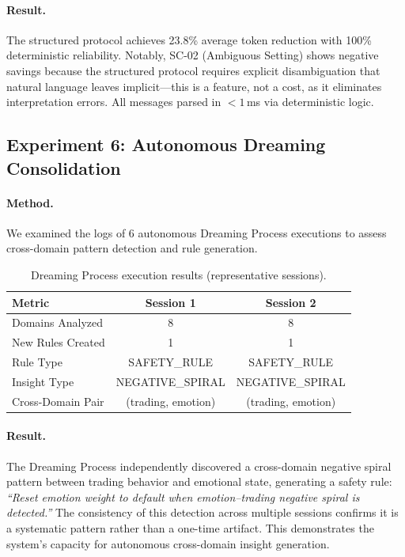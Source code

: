 \documentclass[11pt,a4paper]{article}
\begin{document}
\paragraph{Result.} The structured protocol achieves 23.8\% average token reduction with 100\% deterministic reliability. Notably, SC-02 (Ambiguous Setting) shows negative savings because the structured protocol requires explicit disambiguation that natural language leaves implicit---this is a feature, not a cost, as it eliminates interpretation errors. All messages parsed in $< 1$\,ms via deterministic logic.

\subsection{Experiment 6: Autonomous Dreaming Consolidation}

\paragraph{Method.} We examined the logs of 6 autonomous Dreaming Process executions to assess cross-domain pattern detection and rule generation.

\begin{table}[h]
\centering
\caption{Dreaming Process execution results (representative sessions).}
\label{tab:exp6}
\small
\begin{tabular}{@{}lcc@{}}
\toprule
\textbf{Metric} & \textbf{Session 1} & \textbf{Session 2} \\
\midrule
Domains Analyzed & 8 & 8 \\
New Rules Created & 1 & 1 \\
Rule Type & SAFETY\_RULE & SAFETY\_RULE \\
Insight Type & NEGATIVE\_SPIRAL & NEGATIVE\_SPIRAL \\
Cross-Domain Pair & (trading, emotion) & (trading, emotion) \\
\bottomrule
\end{tabular}
\end{table}

\paragraph{Result.} The Dreaming Process independently discovered a cross-domain negative spiral pattern between trading behavior and emotional state, generating a safety rule: \emph{``Reset emotion weight to default when emotion--trading negative spiral is detected.''} The consistency of this detection across multiple sessions confirms it is a systematic pattern rather than a one-time artifact. This demonstrates the system's capacity for autonomous cross-domain insight generation.
\end{document}
